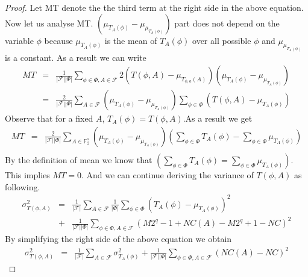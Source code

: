 \begin{proof}
Let MT denote the the third term at the right side in the above equation. Now let us analyse MT. $(\mu_{T_{A}(\phi)} - \mu_{\mu_{T_{A}(\phi)}})$ part does not depend on the variable $\phi$ because $\mu_{T_{A}(\phi)}$ is the mean of $T_{A}(\phi)$ over all possible $\phi$ and $\mu_{\mu_{T_{A}(\phi)}}$ is a constant. As a result we can write
\begin{eqnarray*}
MT &=& \frac{1}{|\mathcal{F}||\Phi|}\displaystyle\sum_{\phi \in \Phi, A \in \mathcal{F}}2\left( T\left(\phi,A\right) - \mu_{T_{\phi,a}\left(A\right)} \right)\left(\mu_{T_{A}(\phi)} - \mu_{\mu_{T_{A}(\phi)}}\right)\\
&=& \frac{2}{|\mathcal{F}||\Phi|} \displaystyle\sum_{A \in \mathcal{F}}\left(\mu_{T_{A}(\phi)} - \mu_{\mu_{T_{A}(\phi)}}\right) \displaystyle\sum_{\phi \in \Phi} \left(T\left(\phi,A\right) - \mu_{T_{A}(\phi)}\right)
\end{eqnarray*}
Observe that for a fixed $A$, $T_{A}\left(\phi\right) = T\left(\phi,A\right)$.As a result we get
\begin{eqnarray*}
MT &=& \frac{2}{|\mathcal{F}||\Phi|} \displaystyle\sum_{A \in \mathbb{F}_{2}^{s}}\left(\mu_{T_{A}(\phi)} - \mu_{\mu_{T_{A}(\phi)}}\right) \left( \displaystyle\sum_{\phi \in \Phi} T_A\left(\phi\right) - \displaystyle\sum_{\phi \in \Phi} \mu_{T_{A}(\phi)} \right)\\
\end{eqnarray*}
By the definition of mean we know that $\left( \displaystyle\sum_{\phi \in \Phi} T_A\left(\phi\right) = \displaystyle\sum_{\phi \in \Phi} \mu_{T_{A}(\phi)} \right)$. This implies $MT = 0$. And we can continue deriving the variance of $T\left(\phi,A\right)$ as following.
\begin{eqnarray*}
\sigma^{2}_{T\left(\phi,A\right)} &=& \frac{1}{|\mathcal{F}|}\displaystyle\sum_{A \in \mathcal{F}}\frac{1}{|\Phi|}\displaystyle\sum_{\phi \in \Phi}(T_{A}\left(\phi\right) - \mu_{T_{A}(\phi)})^2\\
&+& \frac{1}{|\mathcal{F}||\Phi|}\displaystyle\sum_{\phi \in \Phi, A \in \mathcal{F}}(M2^q-1+NC(A) - M2^q+1-NC)^2
\end{eqnarray*}
By simplifying the right side of the above equation we obtain
\begin{eqnarray}
\sigma^{2}_{T\left(\phi,A\right)} &=& \frac{1}{|\mathcal{F}|}\displaystyle\sum_{A \in \mathcal{F}}\sigma_{T_{A}(\phi)}^{2} + \frac{1}{|\mathcal{F}||\Phi|}\displaystyle\sum_{\phi \in \Phi, A \in \mathcal{F}}(NC(A)-NC)^2 \label{eqn:T_A_phi_variance_2}
\end{eqnarray}

\end{proof}
